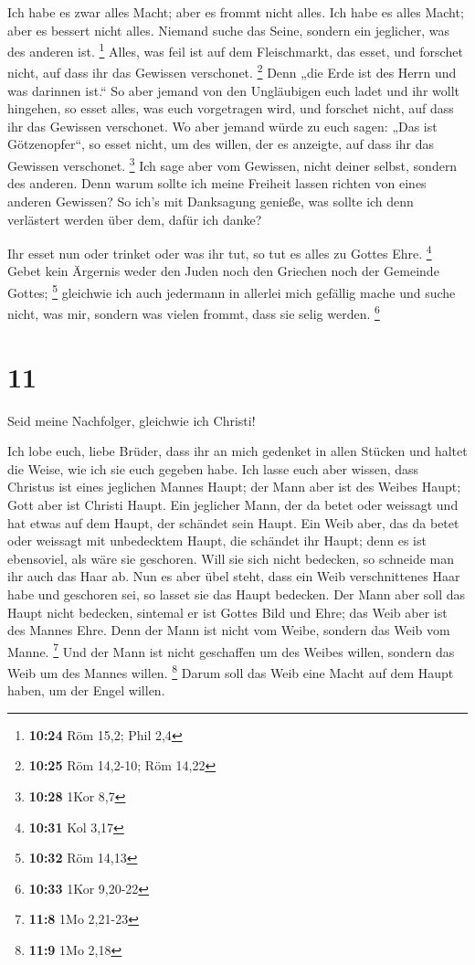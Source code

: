  Ich habe es zwar alles Macht; aber es frommt nicht
alles. Ich habe es alles Macht; aber es bessert nicht alles.
 Niemand suche das Seine, sondern ein jeglicher, was des
anderen ist. \footnote{\textbf{10:24} Röm 15,2; Phil 2,4}
 Alles, was feil ist auf dem Fleischmarkt, das esset, und
forschet nicht, auf dass ihr das Gewissen verschonet. \footnote{\textbf{10:25}
  Röm 14,2-10; Röm 14,22}  Denn „die Erde ist des Herrn
und was darinnen ist.``  So aber jemand von den
Ungläubigen euch ladet und ihr wollt hingehen, so esset alles, was euch
vorgetragen wird, und forschet nicht, auf dass ihr das Gewissen
verschonet.  Wo aber jemand würde zu euch sagen: „Das ist
Götzenopfer``, so esset nicht, um des willen, der es anzeigte, auf dass
ihr das Gewissen verschonet. \footnote{\textbf{10:28} 1Kor 8,7}
 Ich sage aber vom Gewissen, nicht deiner selbst, sondern
des anderen. Denn warum sollte ich meine Freiheit lassen richten von
eines anderen Gewissen?  So ich's mit Danksagung genieße,
was sollte ich denn verlästert werden über dem, dafür ich danke?

 Ihr esset nun oder trinket oder was ihr tut, so tut es
alles zu Gottes Ehre. \footnote{\textbf{10:31} Kol 3,17} 
Gebet kein Ärgernis weder den Juden noch den Griechen noch der Gemeinde
Gottes; \footnote{\textbf{10:32} Röm 14,13}  gleichwie
ich auch jedermann in allerlei mich gefällig mache und suche nicht, was
mir, sondern was vielen frommt, dass sie selig werden. \footnote{\textbf{10:33}
  1Kor 9,20-22}

\hypertarget{section-6}{%
\section{11}\label{section-6}}

 Seid meine Nachfolger, gleichwie ich Christi!

 Ich lobe euch, liebe Brüder, dass ihr an mich gedenket in
allen Stücken und haltet die Weise, wie ich sie euch gegeben habe.
 Ich lasse euch aber wissen, dass Christus ist eines
jeglichen Mannes Haupt; der Mann aber ist des Weibes Haupt; Gott aber
ist Christi Haupt.  Ein jeglicher Mann, der da betet oder
weissagt und hat etwas auf dem Haupt, der schändet sein Haupt.
 Ein Weib aber, das da betet oder weissagt mit unbedecktem
Haupt, die schändet ihr Haupt; denn es ist ebensoviel, als wäre sie
geschoren.  Will sie sich nicht bedecken, so schneide man
ihr auch das Haar ab. Nun es aber übel steht, dass ein Weib
verschnittenes Haar habe und geschoren sei, so lasset sie das Haupt
bedecken.  Der Mann aber soll das Haupt nicht bedecken,
sintemal er ist Gottes Bild und Ehre; das Weib aber ist des Mannes Ehre.
 Denn der Mann ist nicht vom Weibe, sondern das Weib vom
Manne. \footnote{\textbf{11:8} 1Mo 2,21-23}  Und der Mann
ist nicht geschaffen um des Weibes willen, sondern das Weib um des
Mannes willen. \footnote{\textbf{11:9} 1Mo 2,18}  Darum
soll das Weib eine Macht auf dem Haupt haben, um der Engel willen.

